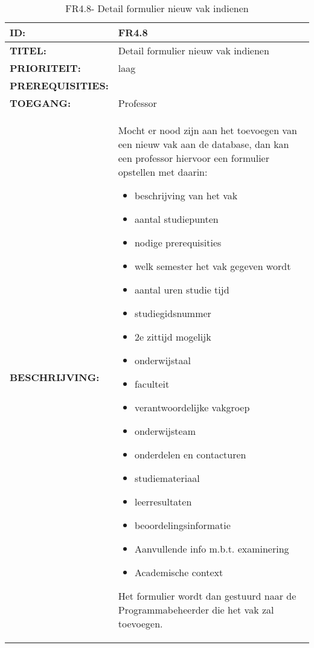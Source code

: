 \noindent\begin{table}[H]
            \begin{tabular}{l | p{10cm}} 
                \textbf{ID:} & FR4.8 \\ \hline
                \textbf{TITEL:} & Detail formulier nieuw vak indienen\\ \hline
                \textbf{PRIORITEIT:} &  laag \\ \hline
                \textbf{PREREQUISITIES:} & \\ \hline
                \textbf{TOEGANG:} & Professor \\ \hline
                \textbf{BESCHRIJVING:} & Mocht er nood zijn aan het toevoegen van een nieuw vak aan de database, dan kan een professor hiervoor een formulier opstellen met daarin:
        \begin{itemize}\itemsep1pt \parskip0pt \parsep0pt
                                        \item beschrijving van het vak
                                        \item aantal studiepunten
                                        \item nodige prerequisities
                                        \item welk semester het vak gegeven wordt
                                        \item aantal uren studie tijd
                                        \item studiegidsnummer
                                        \item 2e zittijd mogelijk
                                        \item onderwijstaal
                                        \item faculteit
                                        \item verantwoordelijke vakgroep
                                        \item onderwijsteam
                                        \item onderdelen en contacturen
                                        \item studiemateriaal
                                        \item leerresultaten
                                        \item beoordelingsinformatie
                                        \item Aanvullende info m.b.t. examinering
                                        \item Academische context
                                        \end{itemize}
                                        Het formulier wordt dan gestuurd naar de Programmabeheerder die het vak zal toevoegen. 
            \end{tabular}\\
            \caption{FR4.8- Detail formulier nieuw vak indienen}
            \label{tab:FR4.8 - Detail formulier nieuw vak indienen}
        \end{table}

